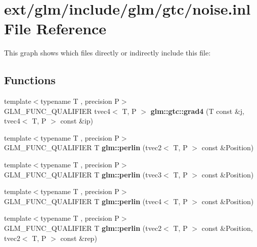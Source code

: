 \hypertarget{noise_8inl}{\section{ext/glm/include/glm/gtc/noise.inl File Reference}
\label{noise_8inl}
}
This graph shows which files directly or indirectly include this file\-:
\subsection*{Functions}
\begin{DoxyCompactItemize}
\item 
\hypertarget{namespaceglm_1_1gtc_a5c4a3d973c67fd78ab6bc8f993d172ac}{{\footnotesize template$<$typename T , precision P$>$ }\\G\-L\-M\-\_\-\-F\-U\-N\-C\-\_\-\-Q\-U\-A\-L\-I\-F\-I\-E\-R tvec4$<$ T, P $>$ {\bfseries glm\-::gtc\-::grad4} (T const \&j, tvec4$<$ T, P $>$ const \&ip)}\label{namespaceglm_1_1gtc_a5c4a3d973c67fd78ab6bc8f993d172ac}

\item 
\hypertarget{namespaceglm_a911cdd6eb03df468ebd2b6f17ea43a3f}{{\footnotesize template$<$typename T , precision P$>$ }\\G\-L\-M\-\_\-\-F\-U\-N\-C\-\_\-\-Q\-U\-A\-L\-I\-F\-I\-E\-R T {\bfseries glm\-::perlin} (tvec2$<$ T, P $>$ const \&Position)}\label{namespaceglm_a911cdd6eb03df468ebd2b6f17ea43a3f}

\item 
\hypertarget{namespaceglm_a86c5aa2c23b2d0f62d3399ac024bc089}{{\footnotesize template$<$typename T , precision P$>$ }\\G\-L\-M\-\_\-\-F\-U\-N\-C\-\_\-\-Q\-U\-A\-L\-I\-F\-I\-E\-R T {\bfseries glm\-::perlin} (tvec3$<$ T, P $>$ const \&Position)}\label{namespaceglm_a86c5aa2c23b2d0f62d3399ac024bc089}

\item 
\hypertarget{namespaceglm_accc072c37eff6ab426b7138d0bd1765f}{{\footnotesize template$<$typename T , precision P$>$ }\\G\-L\-M\-\_\-\-F\-U\-N\-C\-\_\-\-Q\-U\-A\-L\-I\-F\-I\-E\-R T {\bfseries glm\-::perlin} (tvec4$<$ T, P $>$ const \&Position)}\label{namespaceglm_accc072c37eff6ab426b7138d0bd1765f}

\item 
\hypertarget{namespaceglm_aa51d7040ecd2773574a520a4bd41f680}{{\footnotesize template$<$typename T , precision P$>$ }\\G\-L\-M\-\_\-\-F\-U\-N\-C\-\_\-\-Q\-U\-A\-L\-I\-F\-I\-E\-R T {\bfseries glm\-::perlin} (tvec2$<$ T, P $>$ const \&Position, tvec2$<$ T, P $>$ const \&rep)}\label{namespaceglm_aa51d7040ecd2773574a520a4bd41f680}


\end{DoxyCompactItemize}
